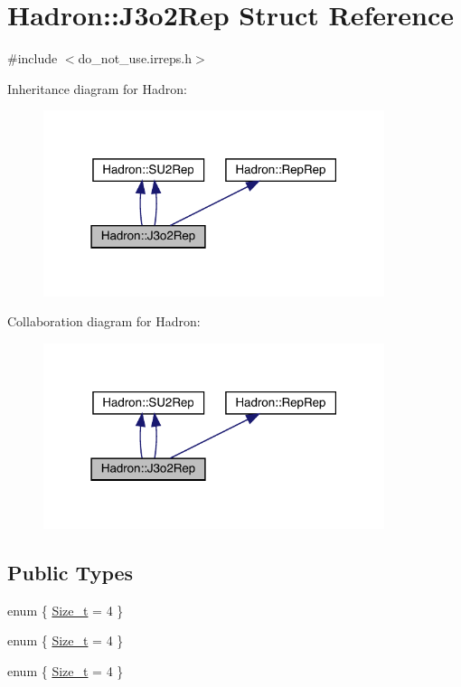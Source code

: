 \hypertarget{structHadron_1_1J3o2Rep}{}\section{Hadron\+:\+:J3o2\+Rep Struct Reference}
\label{structHadron_1_1J3o2Rep}


{\ttfamily \#include $<$do\+\_\+not\+\_\+use.\+irreps.\+h$>$}



Inheritance diagram for Hadron\+:\nopagebreak
\begin{figure}[H]
\begin{center}
\leavevmode
\includegraphics[width=283pt]{d2/d39/structHadron_1_1J3o2Rep__inherit__graph}
\end{center}
\end{figure}


Collaboration diagram for Hadron\+:\nopagebreak
\begin{figure}[H]
\begin{center}
\leavevmode
\includegraphics[width=283pt]{d1/da4/structHadron_1_1J3o2Rep__coll__graph}
\end{center}
\end{figure}
\subsection*{Public Types}
\begin{DoxyCompactItemize}
\item 
enum \{ \mbox{\hyperlink{structHadron_1_1J3o2Rep_ac672bfc63013f85b8d513f2c421bec7ca7310ff2bbe90c48e5d307cd3adc0b46e}{Size\+\_\+t}} = 4
 \}
\item 
enum \{ \mbox{\hyperlink{structHadron_1_1J3o2Rep_ac672bfc63013f85b8d513f2c421bec7ca7310ff2bbe90c48e5d307cd3adc0b46e}{Size\+\_\+t}} = 4
 \}
\item 
enum \{ \mbox{\hyperlink{structHadron_1_1J3o2Rep_ac672bfc63013f85b8d513f2c421bec7ca7310ff2bbe90c48e5d307cd3adc0b46e}{Size\+\_\+t}} = 4
 \}
\end{DoxyCompactItemize}
